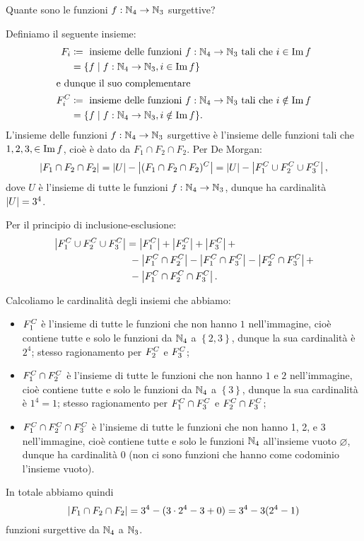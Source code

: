 \begin{example}
    Quante sono le funzioni $f : \mathbb{N}_4 \to \mathbb{N}_3$ surgettive?
\end{example}
\begin{solution}
    Definiamo il seguente insieme: 
    \begin{alignat*}{1}
        F_i &\coloneqq \text{ insieme delle funzioni $f : \mathbb{N}_4 \to \mathbb{N}_3$ tali che $i \in \operatorname{Im} f$} \\
        &= \{ f \mid f : \mathbb{N}_4 \to \mathbb{N}_3, i \in \operatorname{Im} f\}\\
        \intertext{e dunque il suo complementare}
        F_i^C &\coloneqq \text{ insieme delle funzioni $f : \mathbb{N}_4 \to \mathbb{N}_3$ tali che $i \notin \operatorname{Im} f$} \\
        &= \{ f \mid f : \mathbb{N}_4 \to \mathbb{N}_3, i \notin \operatorname{Im} f\}.
    \end{alignat*}
    L'insieme delle funzioni $f : \mathbb{N}_4 \to \mathbb{N}_3$ surgettive è l'insieme delle funzioni tali che $1, 2, 3, \in \operatorname{Im} f$, cioè è dato da $F_1 \cap F_2 \cap F_2$. Per De Morgan: \[
        \left|F_1 \cap F_2 \cap F_2\right| = \left|U\right| - \left|(F_1 \cap F_2 \cap F_2)^C\right|  = \left|U\right| - \left|F_1^C \cup F_2^C \cup F_3^C\right|,
    \] dove $U$ è l'insieme di tutte le funzioni $f : \mathbb{N}_4 \to \mathbb{N}_3$, dunque ha cardinalità $\left|U\right| = 3^4$.

    Per il principio di inclusione-esclusione:
    \begin{alignat*}
        {1}
        \left|F_1^C \cup F_2^C \cup F_3^C\right| &= \left|F_1^C\right| + \left|F_2^C\right| + \left|F_3^C\right| +\\
        &\ - \left|F_1^C \cap F_2^C\right| - \left|F_1^C \cap F_3^C\right| - \left|F_2^C \cap F_3^C\right| + \\
        &\ - \left|F_1^C \cap F_2^C \cap F_3^C\right|.
    \end{alignat*}
\end{solution}

Calcoliamo le cardinalità degli insiemi che abbiamo:
\begin{itemize}
    \item $F_1^C$ è l'insieme di tutte le funzioni che non hanno $1$ nell'immagine, cioè contiene tutte e solo le funzioni da $\mathbb{N}_4$ a $\left\{ 2, 3\right\}$, dunque la sua cardinalità è $2^4$; stesso ragionamento per $F_2^C$ e $F_3^C$;
    \item $F_1^C \cap F_2^C$ è l'insieme di tutte le funzioni che non hanno $1$ e $2$ nell'immagine, cioè contiene tutte e solo le funzioni da $\mathbb{N}_4$ a $\left\{ 3\right\}$, dunque la sua cardinalità è $1^4 = 1$; stesso ragionamento per $F_1^C \cap F_3^C$ e $F_2^C \cap F_3^C$;
    \item $F_1^C \cap F_2^C \cap F_3^C$ è l'insieme di tutte le funzioni che non hanno 1, 2, e 3 nell'immagine, cioè contiene tutte e solo le funzioni $\mathbb{N}_4$ all'insieme vuoto $\varnothing$, dunque ha cardinalità 0 (non ci sono funzioni che hanno come codominio l'insieme vuoto).
\end{itemize}

In totale abbiamo quindi \[
    \left|F_1 \cap F_2 \cap F_2\right| = 3^4 - (3\cdot2^4 - 3 + 0) = 3^4 - 3(2^4 - 1)    
\] funzioni surgettive da $\mathbb{N}_4$ a $\mathbb{N}_3$.